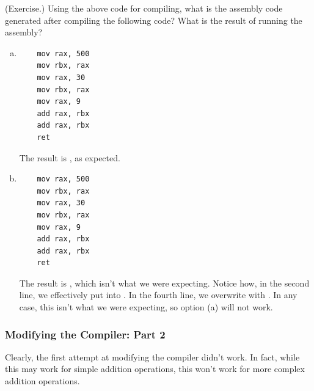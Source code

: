 \begin{mdframed}
    (Exercise.) Using the above code for compiling, what is the assembly code generated after compiling the following code? What is the result of running the assembly? 
    \begin{enumerate}[(a)]
        \item {}
        \begin{mdframed}
            \begin{verbatim}
	mov rax, 500
	mov rbx, rax
	mov rax, 30
	mov rbx, rax
	mov rax, 9
	add rax, rbx
	add rax, rbx
	ret\end{verbatim}
            The result is , as expected.
        \end{mdframed}

        \item {}
        \begin{mdframed}
            \begin{verbatim}
	mov rax, 500
	mov rbx, rax
	mov rax, 30
	mov rbx, rax
	mov rax, 9
	add rax, rbx
	add rax, rbx
	ret\end{verbatim}
            The result is , which isn't what we were expecting. Notice how, in the second line, we effectively put  into . In the fourth line, we overwrite  with . In any case, this isn't what we were expecting, so option (a) will not work. 
        \end{mdframed}
    \end{enumerate}
\end{mdframed}

\subsubsection{Modifying the Compiler: Part 2}
Clearly, the first attempt at modifying the compiler didn't work. In fact, while this may work for simple addition operations, this won't work for more complex addition operations. 

\bigskip 

